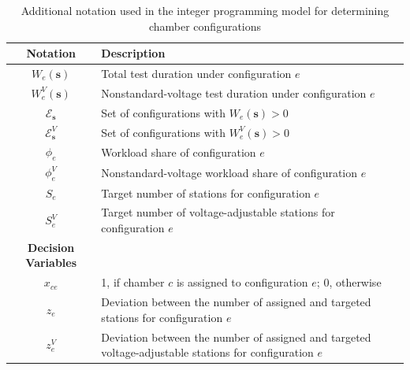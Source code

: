 \documentclass[11pt]{article}
\begin{document}
\begin{table}[H]
\caption{Additional notation used in the integer programming model for determining chamber configurations}
\label{tab:notation_ccd}
\centering
\small
\begin{tabular}{cl}
\toprule
\textbf{Notation} & \textbf{Description}\\
\midrule
\(W_e(\mathbf{s})\) & Total test duration under configuration \(e\) \\
\(W_e^V(\mathbf{s})\) & Nonstandard-voltage test duration under configuration \(e\) \\
\(\mathcal{E}_\mathbf{s}\) & Set of configurations with \(W_e(\mathbf{s})>0\) \\
\(\mathcal{E}^V_\mathbf{s}\) & Set of configurations with \(W_e^V(\mathbf{s})>0\) \\
\(\phi_e\) & Workload share of configuration \(e\) \\
\(\phi_e^V\) & Nonstandard-voltage workload share of configuration \(e\) \\
\(S_e\) & Target number of stations for configuration \(e\) \\
\(S_e^V\) & Target number of voltage-adjustable stations for configuration \(e\) \\
\midrule
\textbf{Decision Variables} & \\
\midrule
\(x_{ce}\) & 1, if chamber \(c\) is assigned to configuration \(e\); 0, otherwise \\
\(z_e\) & \shortstack[l]{Deviation between the number of assigned and\\targeted stations for configuration \(e\)} \\
\(z_e^V\) & \shortstack[l]{Deviation between the number of assigned and\\targeted voltage-adjustable stations for configuration \(e\)} \\
\bottomrule
\end{tabular}
\end{table}
\end{document}
